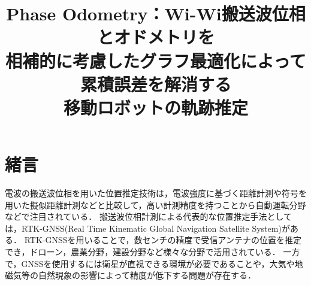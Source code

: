 \documentclass[a4jsme]{jsmepaper}
\title{
 Phase Odometry：Wi-Wi搬送波位相とオドメトリを\\相補的に考慮したグラフ最適化によって累積誤差を解消する\\移動ロボットの軌跡推定
}
\subtitle{
}
\begin{document}
\maketitle
\thispagestyle{empty}
%
\section{緒言}
電波の搬送波位相を用いた位置推定技術は，電波強度に基づく距離計測や符号を用いた擬似距離計測などと比較して，高い計測精度を持つことから自動運転分野などで注目されている\cite{gnss_autonomou_vehicles}．
搬送波位相計測による代表的な位置推定手法としては，RTK-GNSS(Real Time Kinematic Global Navigation Satellite System)\cite{RTK-GNSS}がある．
RTK-GNSSを用いることで，数センチの精度で受信アンテナの位置を推定でき，ドローン\cite{RTK-M300}，農業分野\cite{RTK-Agriculture}，建設分野\cite{six-dump}など様々な分野で活用されている．
一方で，GNSSを使用するには衛星が直視できる環境が必要であることや，大気や地磁気等の自然現象の影響によって精度が低下する問題\cite{gnss_error,STANKOV2007485}が存在する．
\end{document}
